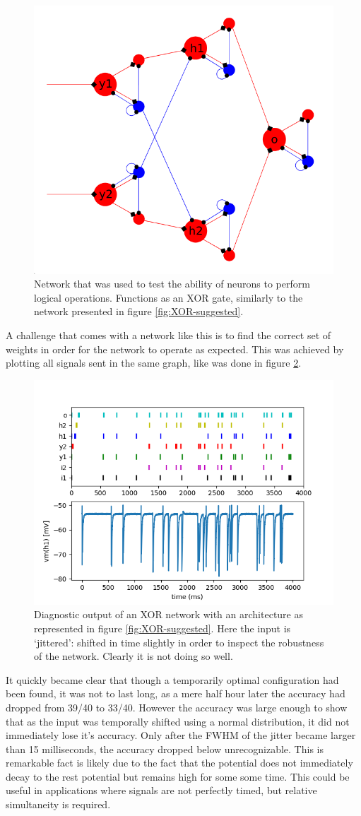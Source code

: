 \documentclass[a4paper,twocolumn]{article}
\begin{document}
\begin{figure}
    \centering
    \includegraphics[width=.5\textwidth]{figures/XOR-used.png}
    \caption{Network that was used to test the ability of neurons to perform
        logical operations. Functions as an XOR gate, similarly to the network
        presented in figure \ref{fig:XOR-suggested}.}
    \label{fig:XOR-used}
\end{figure}

A challenge that comes with a network like this is to find the correct set of
weights in order for the network to operate as expected. This was achieved by
plotting all signals sent in the same graph, like was done in figure
\ref{fig:XOR-output}.

\begin{figure}
    \centering
    \includegraphics[width=.5\textwidth]{figures/XOR-output.png}
    \caption{Diagnostic output of an XOR network with an architecture as
        represented in figure \ref{fig:XOR-suggested}. Here the input is
        `jittered': shifted in time slightly in order to inspect the robustness
        of the network. Clearly it is not doing so well.}
    \label{fig:XOR-output}
\end{figure}

It quickly became clear that though a temporarily optimal configuration had been
found, it was not to last long, as a mere half hour later the accuracy had
dropped from 39/40 to 33/40. However the accuracy was large enough to show that
as the input was temporally shifted using a normal distribution, it did not
immediately lose it's accuracy. Only after the FWHM of the jitter became larger
than 15 milliseconds, the accuracy dropped below unrecognizable. This is
remarkable fact is likely due to the fact that the potential does not
immediately decay to the rest potential but remains high for some some time.
This could be useful in applications where signals are not perfectly timed, but
relative simultaneity is required.
\end{document}
